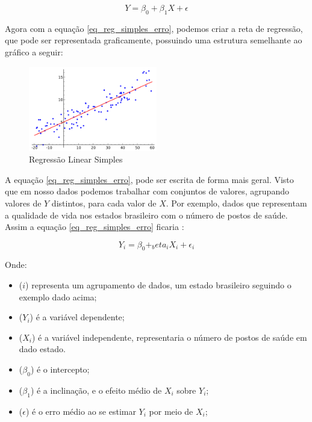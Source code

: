\documentclass[
	12pt,				%
	openright,			%
	oneside,			%
	a4paper,			%
	english,			%
	brazil				%
	]{abntex2}
\begin{document}
\begin{equation}
	\label{eq_reg_simples_erro}
	Y = \beta_0 + \beta_1X + \epsilon
\end{equation}

Agora com a equação \ref{eq_reg_simples_erro}, podemos criar a reta de regressão, que pode ser
representada graficamente, possuindo uma estrutura semelhante ao gráfico a seguir:

\begin{figure}[htb]
    \centering
    \caption{\label{Regressão Linear Simples}Regressão Linear Simples}
    \includegraphics[width=0.50\textwidth]{../Imgs/reg_linear_simples.png}
\end{figure}

A equação \ref{eq_reg_simples_erro}, pode ser escrita de forma mais geral. Visto que em nosso dados
podemos trabalhar com conjuntos de valores, agrupando valores de $Y$ distintos, para cada valor de $X$.
Por exemplo, dados que representam a qualidade de vida nos estados brasileiro com o número de postos 
de saúde. Assim a equação \ref{eq_reg_simples_erro} ficaria \cite{modelos_regressao_linear}:

\begin{equation}
	\label{eq_reg_simples_geral}
	Y_i = \beta_0 + _beta_iX_i + \epsilon_i
\end{equation}

Onde:
\begin{itemize}
	\item ($i$) representa um agrupamento de dados, um estado brasileiro seguindo o exemplo dado acima;
	\item ($Y_i$) é a variável dependente;
	\item ($X_i$) é a variável independente, representaria o número de postos de saúde em dado estado.
	\item ($\beta_0$) é o intercepto;
	\item ($\beta_1$) é a inclinação, e o efeito médio de $X_i$ sobre $Y_i$;
	\item ($\epsilon$) é o erro médio ao se estimar $Y_i$ por meio de $X_i$;
\end{itemize}
\end{document}
